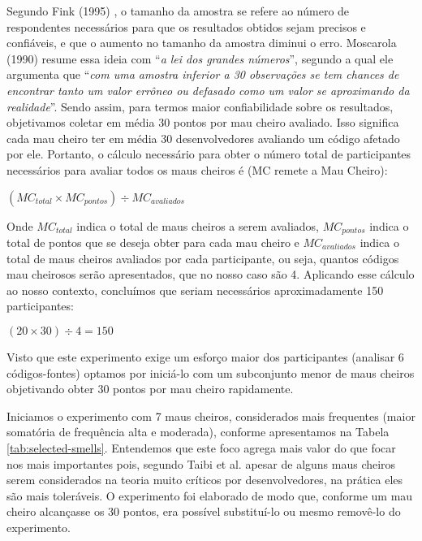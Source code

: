 Segundo Fink (1995) \cite{Fink:95}, o tamanho da amostra se refere ao número de respondentes necessários para que os resultados obtidos sejam precisos e confiáveis, e que o aumento no tamanho da amostra diminui o erro. Moscarola (1990) \cite{Moscarola:90} resume essa ideia com ``\textit{a lei dos grandes números}'', segundo a qual ele argumenta que ``\textit{com uma amostra inferior a 30 observações se tem chances de encontrar tanto um valor errôneo ou defasado como um valor se aproximando da realidade}''. Sendo assim, para termos maior confiabilidade sobre os resultados, objetivamos coletar em média 30 pontos por mau cheiro avaliado. Isso significa cada mau cheiro ter em média 30 desenvolvedores avaliando um código afetado por ele. Portanto, o cálculo necessário para obter o número total de participantes necessários para avaliar todos os maus cheiros é (MC remete a Mau Cheiro): 

\begin{center}
  $(MC_{total} \times MC_{pontos}) \div MC_{avaliados}$
\end{center}

Onde $MC_{total}$ indica o total de maus cheiros a serem avaliados, $MC_{pontos}$ indica o total de pontos que se deseja obter para cada mau cheiro e $MC_{avaliados}$ indica o total de maus cheiros avaliados por cada participante, ou seja, quantos códigos mau cheirosos serão apresentados, que no nosso caso são 4. Aplicando esse cálculo ao nosso contexto, concluímos que seriam necessários aproximadamente 150 participantes:

\begin{center}
  $(20 \times 30) \div 4 = 150$
\end{center}
 
Visto que este experimento exige um esforço maior dos participantes (analisar 6 códigos-fontes) optamos por iniciá-lo com um subconjunto menor de maus cheiros objetivando obter 30 pontos por mau cheiro rapidamente. 

Iniciamos o experimento com 7 maus cheiros, considerados mais frequentes (maior somatória de frequência alta e moderada), conforme apresentamos na Tabela \ref{tab:selected-smells}. Entendemos que este foco agrega mais valor do que focar nos mais importantes pois, segundo Taibi et al. \cite{Taibi:17} apesar de alguns maus cheiros serem considerados na teoria muito críticos por desenvolvedores, na prática eles são mais toleráveis. O experimento foi elaborado de modo que, conforme um mau cheiro alcançasse os 30 pontos, era possível substituí-lo ou mesmo removê-lo do experimento.




